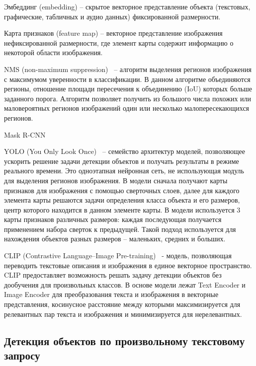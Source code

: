 \documentclass[a4paper,14pt]{article}
\begin{document}
	Эмбеддинг (embedding) -- скрытое векторное представление объекта (текстовых, графические, табличных и аудио данных) фиксированной размерности.
	
	Карта признаков (feature map) -- векторное представление изображения нефиксированной размерности, где элемент карты содержит информацию о некоторой области изображения.
	
	NMS (non-maximum suppression)~\cite{neubeck2006efficient} -- алгоритм выделения регионов изображения с максимумом уверенности в классификации.
	В данном алгоритме объединяются регионы, отношение площади пересечения к объединению (IoU) которых больше заданного порога.
	Алгоритм позволяет получить из большого числа похожих или маловероятных регионов изображений один или несколько малопересекающихся регионов.
	
	Mask R-CNN
	
	YOLO (You Only Look Once)~\cite{redmon2016you} -- семейство архитектур моделей, позволяющее  ускорить решение задачи детекции объектов и получать результаты в режиме реального времени.
	Это одноэтапная нейронная сеть, не использующая модуль для выделения регионов изображения.
	В модели сначала получают карты признаков для изображения с помощью сверточных слоев, далее для каждого элемента карты решаются задачи определения класса объекта и его размеров, центр которого находится в данном элементе карты.
	В модели используется 3 карты признаков различных размеров: каждая последующая получается применением набора сверток к предыдущей.
	Такой подход используется для нахождения объектов разных размеров -- маленьких, средних и больших.
	
	
	CLIP (Contrastive Language–Image Pre-training)~\cite{CLIP} - модель, позволяющая переводить текстовые описания и изображения в единое векторное пространство. 
	CLIP предоставляет возможность решать задачу детекции объектов без дообучения для произвольных классов.
	В основе модели лежат Text Encoder и Image Encoder для преобразования текста и изображения в векторные представления, косинусное расстояние между которыми максимизируется для релевантных пар текста и изображения и минимизируется для нерелевантных.
	
	\subsection{Детекция объектов по произвольному текстовому запросу}
	
\end{document}
